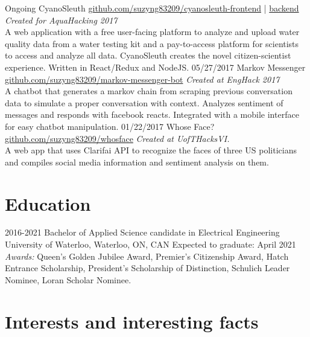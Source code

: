 \documentclass[]{friggeri-cv}
\begin{document}
\begin{entrylist}
	\entry
	{Ongoing}
	{CyanoSleuth}
	{\href{https://github.com/suzyng83209/cyanosleuth-frontend}{github.com/suzyng83209/cyanosleuth-frontend} | \href{https://github.com/suzyng83209/cyanosleuth-backend}{backend}}
	{\emph{Created for AquaHacking 2017} \\
		A web application with a free user-facing platform to analyze and upload water quality data from a water testing kit and a pay-to-access platform for scientists to access and analyze all data. CyanoSleuth creates the novel citizen-scientist experience. Written in React/Redux and NodeJS.
	}
	\entry
	{05/27/2017}
	{Markov Messenger}
	{\href{https://github.com/suzyng83209/markov-messenger-bot}{github.com/suzyng83209/markov-messenger-bot}}
	{\emph{Created at EngHack 2017} \\
		A chatbot that generates a markov chain from scraping previous conversation data to simulate a proper conversation with context. Analyzes sentiment of messages and responds with facebook reacts. Integrated with a mobile interface for easy chatbot manipulation.}
	\entry
	{01/22/2017}
	{Whose Face?}
	{\href{https://github.com/suzyng83209/whosface}{github.com/suzyng83209/whosface}}
	{\emph{Created at UofTHacksVI.} \\
		A web app that uses Clarifai API to recognize the faces of three US politicians and compiles social media information and sentiment analysis on them.}
\end{entrylist}

\section{Education}

\begin{entrylist}
	\entry
	{2016-2021}
	{Bachelor of Applied Science {\normalfont candidate in Electrical Engineering}}
	{\\ University of Waterloo, Waterloo, ON, CAN}
	{Expected to graduate: April 2021 \\
		\emph{Awards:} Queen's Golden Jubilee Award, Premier's Citizenship Award, Hatch Entrance Scholarship, President's Scholarship of Distinction, Schulich Leader Nominee, Loran Scholar Nominee.}
\end{entrylist}

\section{Interests and interesting facts}
\end{document}
